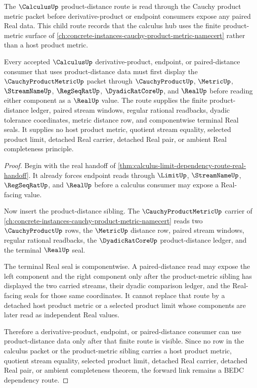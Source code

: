 The $\CalculusUp$ product-distance route is read through the Cauchy product metric packet before derivative-product or endpoint consumers expose any paired Real data. This child route records that the calculus hub uses the finite product-metric surface of \autoref{ch:concrete-instances-cauchy-product-metric-namecert} rather than a host product metric.

\begin{theorem}
\label{thm:calculus-product-metric-forward-link}
Every accepted $\CalculusUp$ derivative-product, endpoint, or paired-distance consumer that uses product-distance data must first display the $\CauchyProductMetricUp$ packet through $\CauchyProductUp$, $\MetricUp$, $\StreamNameUp$, $\RegSeqRatUp$, $\DyadicRatCoreUp$, and $\RealUp$ before reading either component as a $\RealUp$ value. The route supplies the finite product-distance ledger, paired stream windows, regular rational readbacks, dyadic tolerance coordinates, metric distance row, and componentwise terminal Real seals. It supplies no host product metric, quotient stream equality, selected product limit, detached Real carrier, detached Real pair, or ambient Real completeness principle.
\end{theorem}
\begin{proof}
Begin with the real handoff of \autoref{thm:calculus-limit-dependency-route-real-handoff}. It already forces endpoint reads through $\LimitUp$, $\StreamNameUp$, $\RegSeqRatUp$, and $\RealUp$ before a calculus consumer may expose a Real-facing value.

Now insert the product-distance sibling. The $\CauchyProductMetricUp$ carrier of \autoref{ch:concrete-instances-cauchy-product-metric-namecert} reads two $\CauchyProductUp$ rows, the $\MetricUp$ distance row, paired stream windows, regular rational readbacks, the $\DyadicRatCoreUp$ product-distance ledger, and the terminal $\RealUp$ seal.

The terminal Real seal is componentwise. A paired-distance read may expose the left component and the right component only after the product-metric sibling has displayed the two carried streams, their dyadic comparison ledger, and the Real-facing seals for those same coordinates. It cannot replace that route by a detached host product metric or a selected product limit whose components are later read as independent Real values.

Therefore a derivative-product, endpoint, or paired-distance consumer can use product-distance data only after that finite route is visible. Since no row in the calculus packet or the product-metric sibling carries a host product metric, quotient stream equality, selected product limit, detached Real carrier, detached Real pair, or ambient completeness theorem, the forward link remains a BEDC dependency route.
\end{proof}

